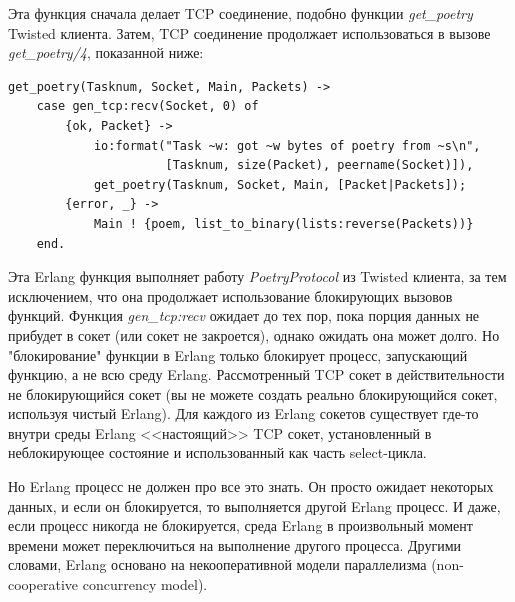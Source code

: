 Эта функция сначала делает TCP соединение, подобно функции 
\textit{get\_poetry} Twisted клиента. Затем, TCP соединение 
продолжает использоваться в вызове \textit{get\_poetry/4}, 
показанной ниже:

\begin{scriptsize}\begin{verbatim}
get_poetry(Tasknum, Socket, Main, Packets) ->
    case gen_tcp:recv(Socket, 0) of
        {ok, Packet} ->
            io:format("Task ~w: got ~w bytes of poetry from ~s\n",
                      [Tasknum, size(Packet), peername(Socket)]),
            get_poetry(Tasknum, Socket, Main, [Packet|Packets]);
        {error, _} ->
            Main ! {poem, list_to_binary(lists:reverse(Packets))}
    end.
\end{verbatim}\end{scriptsize}

Эта Erlang функция выполняет работу \textit{PoetryProtocol} 
из Twisted клиента, за тем исключением, что она продолжает 
использование блокирующих вызовов функций. Функция \textit{gen\_tcp:recv} 
ожидает до тех пор, пока порция данных не прибудет в сокет (или 
сокет не закроется), однако ожидать она может долго. Но "блокирование" 
функции в Erlang только блокирует процесс, запускающий функцию, а не всю 
среду Erlang. Рассмотренный TCP сокет в действительности не блокирующийся 
сокет (вы не можете создать реально блокирующийся сокет, используя чистый Erlang). 
Для каждого из Erlang сокетов существует где-то внутри среды Erlang 
<<настоящий>> TCP сокет, установленный в неблокирующее состояние и использованный 
как часть select-цикла.


Но Erlang процесс не должен про все это знать. Он 
просто ожидает некоторых данных, и если он блокируется, 
то выполняется другой Erlang процесс. И даже, если 
процесс никогда не блокируется, среда Erlang в произвольный 
момент времени может переключиться 
на выполнение другого процесса. Другими словами, Erlang основано 
на некооперативной модели параллелизма (non-cooperative concurrency model).  
  

